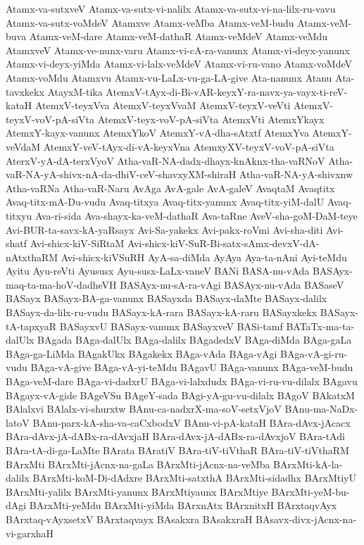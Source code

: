 {Atamx-va-sutxveV
Atamx-va-sutx-vi-nalilx
Atamx-va-sutx-vi-na-lilx-ru-vavu
Atamx-va-sutx-voMdeV
Atamxve
Atamx-veMba
Atamx-veM-budu
Atamx-veM-buva
Atamx-veM-dare
Atamx-veM-dathaR
Atamx-veMdeV
Atamx-veMdu
AtamxveV
Atamx-ve-nunx-varu
Atamx-vi-cA-ra-vanunx
Atamx-vi-deyx-yanunx
Atamx-vi-deyx-yiMda
Atamx-vi-lalx-veMdeV
Atamx-vi-ru-vano
Atamx-voMdeV
Atamx-voMdu
Atamxvu
Atamx-vu-LaLx-vu-ga-LA-give
Ata-nanunx
Atanu
Ata-tavxkekx
AtayxM-tika
AtemxV-tAyx-di-Bi-vAR-keyxY-ra-navx-ya-vayx-ti-reV-kataH
AtemxV-teyxVva
AtemxV-teyxVvaM
AtemxV-teyxV-veVti
AtemxV-teyxV-voV-pA-siVta
AtemxV-teyx-voV-pA-siVta
AtemxVti
AtemxYkayx
AtemxY-kayx-vanunx
AtemxYkoV
AtemxY-vA-dha-sAtxtf
AtemxYva
AtemxY-veVdaM
AtemxY-veV-tAyx-di-vA-keyxVna
AtemxyXV-teyxV-voV-pA-siVta
AterxV-yA-dA-terxVyoV
Atha-vaR-NA-dadx-dhayx-knAknx-tha-vaRNoV
Atha-vaR-NA-yA-shivx-nA-da-dhiV-ceV-shavxyXM-shiraH
Atha-vaR-NA-yA-shivxnw
Atha-vaRNa
Atha-vaR-Naru
AvAga
AvA-gale
AvA-galeV
AvaqtaM
Avaqtitx
Avaq-titx-mA-Du-vudu
Avaq-titxya
Avaq-titx-yanunx
Avaq-titx-yiM-dalU
Avaq-titxyu
Ava-ri-sida
Ava-shayx-ka-veM-dathaR
Ava-taRne
AveV-sha-goM-DaM-teye
Avi-BUR-ta-savx-kA-yaRsayx
Avi-Sa-yakekx
Avi-pakx-roVmi
Avi-sha-diti
Avi-shatf
Avi-shicx-kiV-SiRtaM
Avi-shicx-kiV-SuR-Bi-satx-sAmx-devxV-dA-nAtxthaRM
Avi-shicx-kiVSuRH
AyA-sa-diMda
AyAya
Aya-ta-nAni
Ayi-teMdu
Ayitu
Ayu-reVti
Ayususx
Ayu-susx-LaLx-vaneV
BANi
BASA-nu-vAda
BASAyx-maq-ta-ma-hoV-dadheVH
BASAyx-nu-sA-ra-vAgi
BASAyx-nu-vAda
BASaseV
BASayx
BASayx-BA-ga-vanunx
BASayxda
BASayx-daMte
BASayx-dalilx
BASayx-da-lilx-ru-vudu
BASayx-kA-rara
BASayx-kA-raru
BASayxkekx
BASayx-tA-tapxyaR
BASayxvU
BASayx-vanunx
BASayxveV
BASi-tamf
BATaTx-ma-ta-dalUlx
BAgada
BAga-dalUlx
BAga-dalilx
BAgadedxV
BAga-diMda
BAga-gaLa
BAga-ga-LiMda
BAgakUkx
BAgakekx
BAga-vAda
BAga-vAgi
BAga-vA-gi-ru-vudu
BAga-vA-give
BAga-vA-yi-teMdu
BAgavU
BAga-vanunx
BAga-veM-budu
BAga-veM-dare
BAga-vi-dadxrU
BAga-vi-lalxdudx
BAga-vi-ru-vu-dilalx
BAgavu
BAgayx-vA-gide
BAgeVSu
BAgeY-sada
BAgi-yA-gu-vu-dilalx
BAgoV
BAkatxM
BAlalxvi
BAlalx-vi-shurxtw
BAnu-ca-nadxrX-ma-soV-setxVjoV
BAnu-ma-NaDx-latoV
BAnu-parx-kA-sha-va-caCxbodxV
BAnu-vi-pA-kataH
BAra-dAvx-jAcacx
BAra-dAvx-jA-dABx-ra-dAvxjaH
BAra-dAvx-jA-dABx-ra-dAvxjoV
BAra-tAdi
BAra-tA-di-ga-LaMte
BArata
BAratiV
BAra-tiV-tiVthaR
BAra-tiV-tiVthaRM
BArxMti
BArxMti-jAcnx-na-gaLa
BArxMti-jAcnx-na-veMba
BArxMti-kA-la-dalilx
BArxMti-koM-Di-dAdxre
BArxMti-satxthA
BArxMti-sidadhx
BArxMtiyU
BArxMti-yalilx
BArxMti-yanunx
BArxMtiyaunx
BArxMtiye
BArxMti-yeM-bu-dAgi
BArxMti-yeMdu
BArxMti-yiMda
BArxnAtx
BArxnitxH
BArxtaqvAyx
BArxtaq-vAyxsetxV
BArxtaqvayx
BAsakxra
BAsakxraH
BAsavx-divx-jAcnx-na-vi-garxhaH
}

